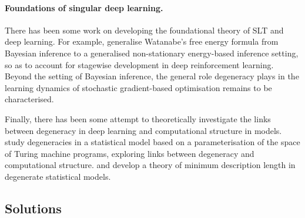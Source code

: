 \documentclass[11pt]{article}
\begin{document}
\paragraph{Foundations of singular deep learning.}

There has been some work on developing the foundational theory of SLT and deep learning.
%
For example, \citet{Elliott+2026} generalise Watanabe's free energy formula from Bayesian inference to a generalised non-stationary energy-based inference setting, so as to account for stagewise development in deep reinforcement learning.
%
Beyond the setting of Bayesian inference, the general role degeneracy plays in the learning dynamics of stochastic gradient-based optimisation remains to be characterised.

Finally, there has been some attempt to theoretically investigate the links between degeneracy in deep learning and computational structure in models.
%
\citet{Clift+2021,Waring2021,Xu2021,Murfet2024,Murfet+Troiani2025} study degeneracies in a statistical model based on a parameterisation of the space of Turing machine programs, exploring links between degeneracy and computational structure.
% 
\citet[][Chapter~5]{Lau2025} and \citet{Urdshals+2025} develop a theory of minimum description length in degenerate statistical models.



\clearpage



\begin{pdfonly}
\begin{solutionsonly}
\clearpage
\appendix
\section{Solutions}
\label{apx:solutions}


\newcommand\solutionlistskip{\protect\addvspace{2ex}}
\end{solutionsonly}
\end{pdfonly}

\end{document}
